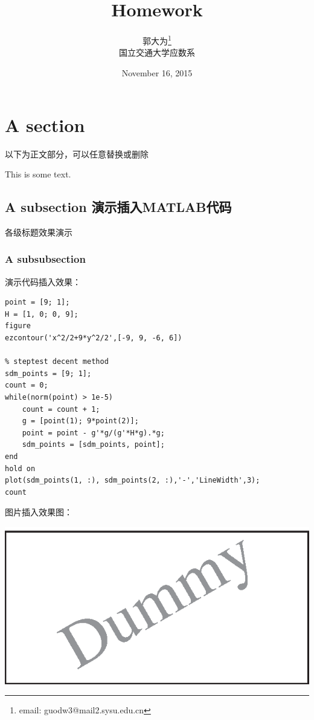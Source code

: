 \documentclass[10pt,a4paper]{article}
\author{郭大为\footnote{email: guodw3@mail2.sysu.edu.cn}\\[2ex]
    国立交通大学应数系\\[2ex]}
\title{Homework \uppercase\expandafter{\romannumeral4}}
\date{November 16, 2015}
\begin{document}
\makeatletter
\let\@afterindentfalse\@afterindenttrue
\@afterindenttrue
\makeatother
\setlength{\parindent}{2em}  %

\maketitle

\section{A section}
以下为正文部分，可以任意替换或删除

This is some text.

\subsection{A subsection 演示插入MATLAB代码}
各级标题效果演示
\subsubsection{A subsubsection}
演示代码插入效果：
\begin{lstlisting}[title=sd\_method.m, frame=shadowbox]
point = [9; 1];
H = [1, 0; 0, 9];
figure
ezcontour('x^2/2+9*y^2/2',[-9, 9, -6, 6])

% steptest decent method
sdm_points = [9; 1];
count = 0;
while(norm(point) > 1e-5)
    count = count + 1;
    g = [point(1); 9*point(2)];
    point = point - g'*g/(g'*H*g).*g;
    sdm_points = [sdm_points, point];
end
hold on
plot(sdm_points(1, :), sdm_points(2, :),'-','LineWidth',3);
count
\end{lstlisting}
图片插入效果图：
    \begin{center}
		\includegraphics[width=1\textwidth]{dummy.eps}
	\end{center}
\end{document}
